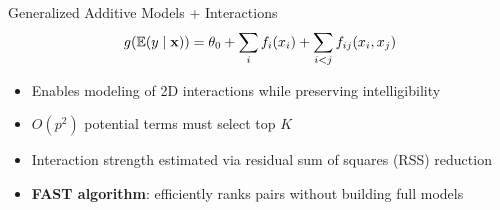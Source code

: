 \documentclass[11pt,compress,t,notes=noshow,aspectratio=169,xcolor=table]{beamer}
\begin{document}
\begin{frame}{Generalized Additive Models + Interactions} \begin{equation*} g(\mathbb{E}(y \mid \mathbf{x})) = \theta_0 + \sum_i f_i(x_i) + \sum_{i<j} f_{ij}(x_i, x_j) \end{equation*} \begin{itemize} \item Enables modeling of 2D interactions while preserving intelligibility \item $O(p^2)$ potential terms \textemdash{} must select top $K$ \item Interaction strength estimated via residual sum of squares (RSS) reduction \item \textbf{FAST algorithm}: efficiently ranks pairs without building full models \end{itemize} \end{frame}
\end{document}
